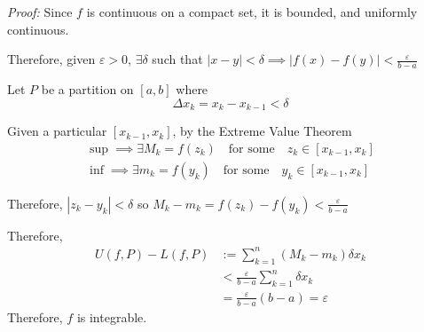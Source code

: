 \documentclass[12pt]{report}
\newcommand{\abs}[1]{\left\vert #1 \right\vert}
\newcommand{\ep}{\varepsilon}
\newenvironment*{tbox}[2][gray]{
    \begin{tcolorbox}[
        parbox=false,
        colback=#1!5!white,
        colframe=#1!75!black,
        breakable,
        title={#2}
    ]}
    {\end{tcolorbox}}
\begin{document}
    \begin{tbox}{\textbf{Theorem:} If $f$ is continuous on $[a, b]$ then it is integrable. }
        \emph{Proof:} Since $f$ is continuous on a compact set, it is bounded, and uniformly continuous. 

        Therefore, given $\ep > 0$, $\exists \delta$ such that $\abs{x - y} < \delta \implies \abs{f(x) - f(y)} < \frac{\ep}{b - a}$

        Let $P$ be a partition on $[a, b]$ where 
        \[\Delta x_k = x_k - x_{k-1} < \delta\] 

        Given a particular $[x_{k-1}, x_k]$, by the Extreme Value Theorem 
        \begin{align*}
            \sup \implies \exists M_k = f(z_k) \quad \text{for some} \quad z_k \in [x_{k-1}, x_k]\\ 
            \inf \implies \exists m_k = f(y_k) \quad \text{for some} \quad y_k \in [x_{k-1}, x_k]
        \end{align*}

        Therefore, $\abs{z_k - y_k} < \delta$ so $M_k - m_k = f(z_k) - f(y_k) < \frac{\ep}{b - a}$

        Therefore, 
        \begin{align*}
            U(f, P) - L(f, P) &:= \sum_{k=1}^n (M_k - m_k) \delta x_k\\ 
            &< \frac{\ep}{b - a} \sum_{k=1}^n \delta x_k\\ 
            &= \frac{\ep}{b - a} (b - a) = \ep
        \end{align*}
        Therefore, $f$ is integrable.
    \end{tbox}
    
\end{document}
